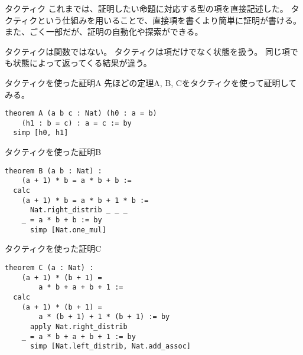 \documentclass[unicode,12pt]{beamer}%
\begin{document}
\begin{frame}{タクティク}
  これまでは、証明したい命題に対応する型の項を直接記述した。
  タクティクという仕組みを用いることで、直接項を書くより簡単に証明が書ける。
  また、ごく一部だが、証明の自動化や探索ができる。

  タクティクは関数ではない。
  タクティクは項だけでなく状態を扱う。
  同じ項でも状態によって返ってくる結果が違う。
\end{frame}

\begin{frame}[fragile]{タクティクを使った証明A}
  先ほどの定理A, B, Cをタクティクを使って証明してみる。
  \begin{tcolorbox}[title=Assist.lean]
  \setlength{\baselineskip}{12pt}
  \begin{Verbatim}[commandchars=\\\{\}, baselinestretch=1.5]
theorem A (a b c : Nat) (h0 : a = b)
    (h1 : b = c) : a = c := by
  simp [h0, h1]
  \end{Verbatim}
  \end{tcolorbox}  
\end{frame}

\begin{frame}[fragile]{タクティクを使った証明B}
  \begin{tcolorbox}[title=Assist.lean]
  \setlength{\baselineskip}{12pt}
  \begin{Verbatim}[commandchars=\\\{\}, baselinestretch=1.5]
theorem B (a b : Nat) :
    (a + 1) * b = a * b + b :=
  calc
    (a + 1) * b = a * b + 1 * b :=
      Nat.right_distrib _ _ _
    _ = a * b + b := by
      simp [Nat.one_mul]
  \end{Verbatim}
  \end{tcolorbox}  
\end{frame}

\begin{frame}[fragile]{タクティクを使った証明C}
  \begin{tcolorbox}[title=Assist.lean]
  \setlength{\baselineskip}{12pt}
  \begin{Verbatim}[commandchars=\\\{\}, baselinestretch=1.5]
theorem C (a : Nat) :
    (a + 1) * (b + 1) =
        a * b + a + b + 1 :=
  calc
    (a + 1) * (b + 1) =
        a * (b + 1) + 1 * (b + 1) := by
      apply Nat.right_distrib
    _ = a * b + a + b + 1 := by
      simp [Nat.left_distrib, Nat.add_assoc]
  \end{Verbatim}
  \end{tcolorbox}  
\end{frame}
\end{document}
